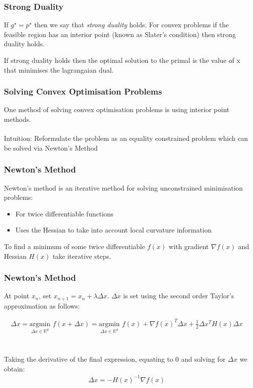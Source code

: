 \documentclass{beamer}
\def\rnum{\mathbb{R}}
\begin{document}
\begin{frame}
    \frametitle{Strong Duality}
    If $g^{\star} = p^{\star}$ then we say that \textit{strong duality} holds.
    For convex problems if the feasible region has an interior point (known as
    Slater's condition) then strong duality holds.

    If strong duality holds then the optimal solution to the primal is the value
    of x that minimises the lagrangaian dual.
\end{frame}

\begin{frame}
    \frametitle{Solving Convex Optimisation Problems}
    One method of solving convex optimisation problems is using interior point
    methods.
    \\~\\
    Intuition: Reformulate the problem as an equality constrained problem which
    can be solved via Newton's Method
\end{frame}

\begin{frame}
    \frametitle{Newton's Method}
    Newton's method is an iterative method for solving unconstrained minimisation problems:
    \begin{itemize}
        \item For twice differentiable functions
        \item Uses the Hessian to take into account local curvature information
    \end{itemize}
    To find a minimum of some twice differentiable $f(x)$ with gradient $\nabla
    f(x)$ and Hessian $H(x)$ take iterative
    steps.
\end{frame}

\begin{frame}
    \frametitle{Newton's Method}
    At point $x_{n}$, set $x_{n+1} = x_{n} + \lambda \Delta x$. $\Delta x$ is set
    using the second order Taylor's approximation as follows:

    \begin{align*}
        \Delta x = \underset{\Delta x \in \rnum^{d}}{\text{argmin}}\, \,f(x + \Delta
        x) = \underset{\Delta x \in \rnum^{d}}{\text{argmin}} \, \, f(x) + \nabla f(x)^{T}
        \Delta x + \frac{1}{2}\Delta x^{T}H(x)\Delta x
    \end{align*}
    \\~\\
    Taking the derivative of the final expression, equating to 0 and solving for
    $\Delta x$ we obtain:
    \begin{align*}
        \Delta x = -H(x)^{-1}\nabla f(x)
    \end{align*}
\end{frame}
\end{document}
